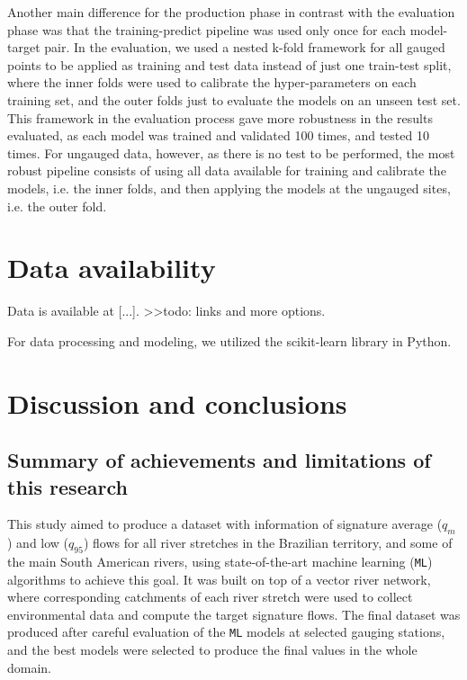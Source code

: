\documentclass[12pt]{article}
\begin{document}
\par Another main difference for the production phase in contrast with the evaluation phase was that the training-predict pipeline was used only once for each model-target pair. In the evaluation, we used a nested k-fold framework for all gauged points to be applied as training and test data instead of just one train-test split, where the inner folds were used to calibrate the hyper-parameters on each training set, and the outer folds just to evaluate the models on an  unseen test set. This framework in the evaluation process gave more robustness in the results evaluated, as each model was trained and validated 100 times, and tested 10 times. For ungauged data, however, as there is no test to be performed, the most robust pipeline consists of using all data available for training and calibrate the models, i.e. the inner folds, and then applying the models at the ungauged sites, i.e. the outer fold.


\section{Data availability}\label{dataav}

\par Data is available at [...]. >>todo: links and more options.

\par For data processing and modeling, we utilized the scikit-learn library in Python.

\section{Discussion and conclusions} \label{discussion}

\subsection{Summary of achievements and limitations of this research} \label{discussion:dataset}

\par This study aimed to produce a dataset with information of signature average ($q_{m}$) and low ($q_{95}$) flows for all river stretches in the Brazilian territory, and some of the main South American rivers, using state-of-the-art machine learning (\texttt{ML}) algorithms to achieve this goal. It was built on top of a vector river network, where corresponding catchments of each river stretch were used to collect environmental data and compute the target signature flows. The final dataset was produced after careful evaluation of the \texttt{ML} models at selected gauging stations, and the best models were selected to produce the final values in the whole domain.
\end{document}
